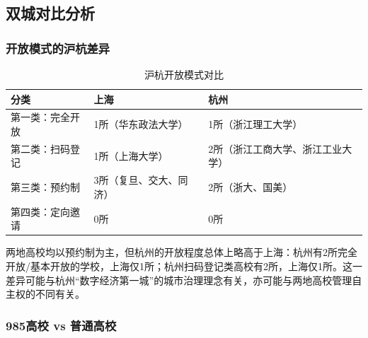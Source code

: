 \documentclass[12pt]{article}
\begin{document}
\subsection{双城对比分析}

\subsubsection{开放模式的沪杭差异}

\begin{table}[H]
\centering
\caption{沪杭开放模式对比}
\label{tab:comparison}
\begin{tabular}{p{3.5cm}p{4cm}p{4cm}}
\toprule
\textbf{分类} & \textbf{上海} & \textbf{杭州} \\
\midrule
第一类：完全开放 & 1所（华东政法大学） & 1所（浙江理工大学） \\
第二类：扫码登记 & 1所（上海大学） & 2所（浙江工商大学、浙江工业大学） \\
第三类：预约制 & 3所（复旦、交大、同济） & 2所（浙大、国美） \\
第四类：定向邀请 & 0所 & 0所 \\
\bottomrule
\end{tabular}
\end{table}

两地高校均以预约制为主，但杭州的开放程度总体上略高于上海：杭州有2所完全开放/基本开放的学校，上海仅1所；杭州扫码登记类高校有2所，上海仅1所。这一差异可能与杭州“数字经济第一城”的城市治理理念有关，亦可能与两地高校管理自主权的不同有关。

\subsubsection{985高校 vs 普通高校}
\end{document}
